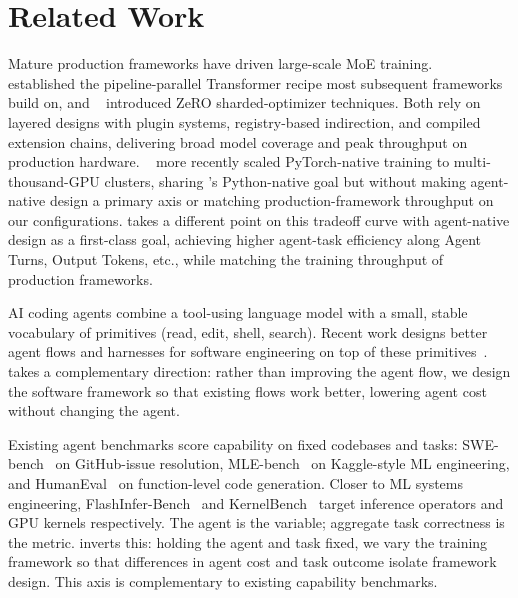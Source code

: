 \section{Related Work}
\label{sec:related}

Mature production frameworks have driven large-scale MoE training.
\megatron~\cite{shoeybi2020megatronlmtrainingmultibillionparameter,narayanan2021efficientlargescalelanguagemodel}
established the pipeline-parallel Transformer recipe most
subsequent frameworks build on, and
\deepspeed~\cite{deepspeed,rajbhandari2020zeromemoryoptimizationstraining}
introduced ZeRO sharded-optimizer techniques. Both rely on
layered designs with plugin systems, registry-based indirection,
and compiled extension chains, delivering broad model coverage
and peak throughput on production hardware.
\torchtitan~\cite{liang2025torchtitanonestoppytorchnative} more
recently scaled PyTorch-native training to multi-thousand-GPU
clusters, sharing \sys's Python-native goal but without making
agent-native design a primary axis or matching production-framework
throughput on our configurations. \sys takes a different point on
this tradeoff curve with agent-native design as a first-class
goal, achieving higher agent-task efficiency along Agent Turns,
Output Tokens, etc., while matching the training throughput of
production frameworks.

AI coding agents combine a tool-using language model with a small,
stable vocabulary of primitives (read, edit, shell, search).
Recent work designs better agent flows and harnesses for software
engineering on top of these
primitives~\cite{yao2023react,yang2024sweagentagentcomputerinterfacesenable,zhang2024autocoderoverautonomousprogramimprovement}.
\sys takes a complementary direction: rather than improving the
agent flow, we design the software framework so that existing
flows work better, lowering agent cost without changing the agent.

Existing agent benchmarks score capability on fixed codebases and
tasks: SWE-bench~\cite{jimenez2024swebench} on GitHub-issue
resolution, MLE-bench~\cite{chan2025mlebench} on Kaggle-style ML
engineering, and
HumanEval~\cite{chen2021evaluatinglargelanguagemodels} on
function-level code generation. Closer to ML systems engineering,
FlashInfer-Bench~\cite{xing2026flashinferbenchbuildingvirtuouscycle}
and KernelBench~\cite{ouyang2025kernelbench} target inference
operators and GPU kernels respectively. The agent is the variable;
aggregate task correctness is the metric. \sysbench inverts this: holding
the agent and task fixed, we vary the training framework so
that differences in agent cost and task outcome isolate framework
design. This axis is complementary to
existing capability benchmarks.
